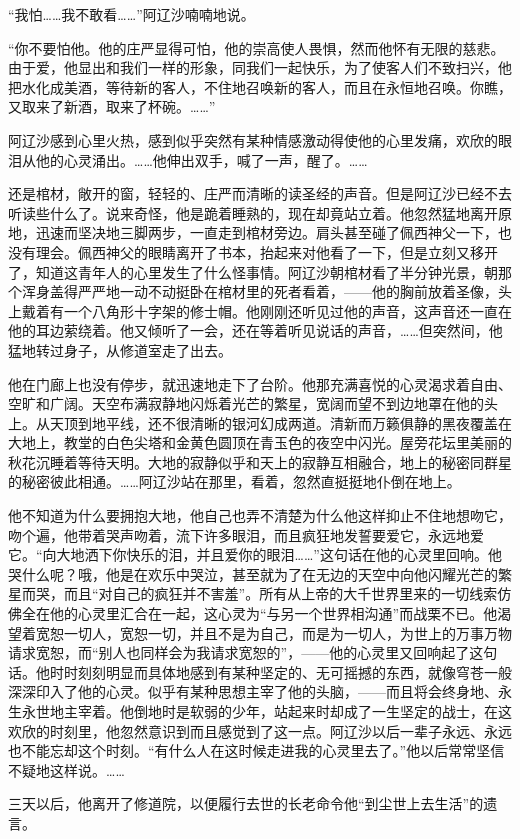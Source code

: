 \par “我怕……我不敢看……”阿辽沙喃喃地说。
\par “你不要怕他。他的庄严显得可怕，他的崇高使人畏惧，然而他怀有无限的慈悲。由于爱，他显出和我们一样的形象，同我们一起快乐，为了使客人们不致扫兴，他把水化成美酒，等待新的客人，不住地召唤新的客人，而且在永恒地召唤。你瞧，又取来了新酒，取来了杯碗。……”
\par 阿辽沙感到心里火热，感到似乎突然有某种情感激动得使他的心里发痛，欢欣的眼泪从他的心灵涌出。……他伸出双手，喊了一声，醒了。……
\par 还是棺材，敞开的窗，轻轻的、庄严而清晰的读圣经的声音。但是阿辽沙已经不去听读些什么了。说来奇怪，他是跪着睡熟的，现在却竟站立着。他忽然猛地离开原地，迅速而坚决地三脚两步，一直走到棺材旁边。肩头甚至碰了佩西神父一下，也没有理会。佩西神父的眼睛离开了书本，抬起来对他看了一下，但是立刻又移开了，知道这青年人的心里发生了什么怪事情。阿辽沙朝棺材看了半分钟光景，朝那个浑身盖得严严地一动不动挺卧在棺材里的死者看着，——他的胸前放着圣像，头上戴着有一个八角形十字架的修士帽。他刚刚还听见过他的声音，这声音还一直在他的耳边萦绕着。他又倾听了一会，还在等着听见说话的声音，……但突然间，他猛地转过身子，从修道室走了出去。
\par 他在门廊上也没有停步，就迅速地走下了台阶。他那充满喜悦的心灵渴求着自由、空旷和广阔。天空布满寂静地闪烁着光芒的繁星，宽阔而望不到边地罩在他的头上。从天顶到地平线，还不很清晰的银河幻成两道。清新而万籁俱静的黑夜覆盖在大地上，教堂的白色尖塔和金黄色圆顶在青玉色的夜空中闪光。屋旁花坛里美丽的秋花沉睡着等待天明。大地的寂静似乎和天上的寂静互相融合，地上的秘密同群星的秘密彼此相通。……阿辽沙站在那里，看着，忽然直挺挺地仆倒在地上。
\par 他不知道为什么要拥抱大地，他自己也弄不清楚为什么他这样抑止不住地想吻它，吻个遍，他带着哭声吻着，流下许多眼泪，而且疯狂地发誓要爱它，永远地爱它。“向大地洒下你快乐的泪，并且爱你的眼泪……”这句话在他的心灵里回响。他哭什么呢？哦，他是在欢乐中哭泣，甚至就为了在无边的天空中向他闪耀光芒的繁星而哭，而且“对自己的疯狂并不害羞”。所有从上帝的大千世界里来的一切线索仿佛全在他的心灵里汇合在一起，这心灵为“与另一个世界相沟通”而战栗不已。他渴望着宽恕一切人，宽恕一切，并且不是为自己，而是为一切人，为世上的万事万物请求宽恕，而“别人也同样会为我请求宽恕的”，——他的心灵里又回响起了这句话。他时时刻刻明显而具体地感到有某种坚定的、无可摇撼的东西，就像穹苍一般深深印入了他的心灵。似乎有某种思想主宰了他的头脑，——而且将会终身地、永生永世地主宰着。他倒地时是软弱的少年，站起来时却成了一生坚定的战士，在这欢欣的时刻里，他忽然意识到而且感觉到了这一点。阿辽沙以后一辈子永远、永远也不能忘却这个时刻。“有什么人在这时候走进我的心灵里去了。”他以后常常坚信不疑地这样说。……
\par 三天以后，他离开了修道院，以便履行去世的长老命令他“到尘世上去生活”的遗言。







